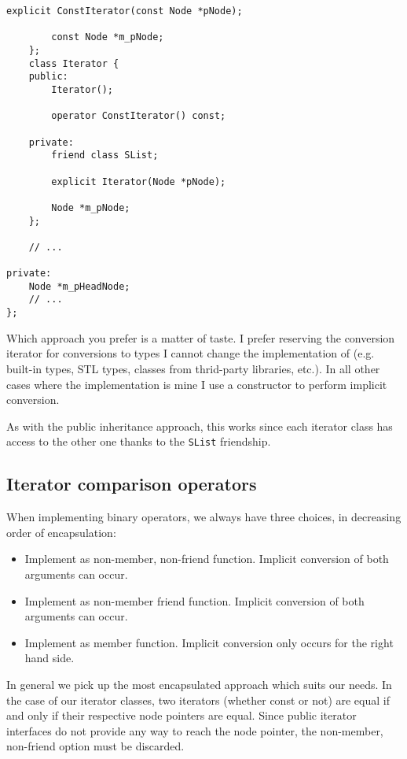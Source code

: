 \begin{itemize}
\begin{lstlisting}[frame=single, caption={SList.h}]
        explicit ConstIterator(const Node *pNode);
        
        const Node *m_pNode;
    };
    class Iterator {
    public:
        Iterator();
        
        operator ConstIterator() const;
        
    private:
        friend class SList;
    
        explicit Iterator(Node *pNode);
        
        Node *m_pNode;
    };

    // ...

private:
    Node *m_pHeadNode;
    // ...
};
\end{lstlisting}
\end{itemize}
Which approach you prefer is a matter of taste. I prefer reserving the conversion iterator for conversions to types I cannot change the implementation of (e.g. built-in types, STL types, classes from thrid-party libraries, etc.). In all other cases where the implementation is mine I use a constructor to perform implicit conversion.

As with the public inheritance approach, this works since each iterator class has access to the other one thanks to the \lstinline!SList! friendship.

\subsection{Iterator comparison operators}
When implementing binary operators, we always have three choices, in decreasing order of encapsulation:
\begin{itemize}
\item Implement as non-member, non-friend function. Implicit conversion of both arguments can occur.
\item Implement as non-member friend function. Implicit conversion of both arguments can occur.
\item Implement as member function. Implicit conversion only occurs for the right hand side.
\end{itemize}

In general we pick up the most encapsulated approach which suits our needs. In the case of our iterator classes, two iterators (whether const or not) are equal if and only if their respective node pointers are equal. Since public iterator interfaces do not provide any way to reach the node pointer, the non-member, non-friend option must be discarded.

